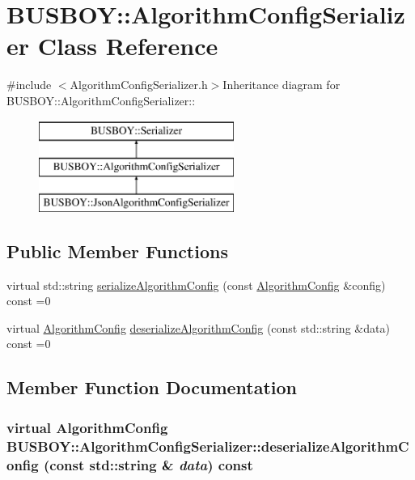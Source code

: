 \hypertarget{classBUSBOY_1_1AlgorithmConfigSerializer}{
\section{BUSBOY::AlgorithmConfigSerializer Class Reference}
\label{classBUSBOY_1_1AlgorithmConfigSerializer}
}


{\ttfamily \#include $<$AlgorithmConfigSerializer.h$>$}Inheritance diagram for BUSBOY::AlgorithmConfigSerializer::\begin{figure}[H]
\begin{center}
\leavevmode
\includegraphics[height=3cm]{classBUSBOY_1_1AlgorithmConfigSerializer}
\end{center}
\end{figure}
\subsection*{Public Member Functions}
\begin{DoxyCompactItemize}
\item 
virtual std::string \hyperlink{classBUSBOY_1_1AlgorithmConfigSerializer_aab7e9c8da6db22fd09cc1faf8758e58f}{serializeAlgorithmConfig} (const \hyperlink{classBUSBOY_1_1AlgorithmConfig}{AlgorithmConfig} \&config) const =0
\item 
virtual \hyperlink{classBUSBOY_1_1AlgorithmConfig}{AlgorithmConfig} \hyperlink{classBUSBOY_1_1AlgorithmConfigSerializer_a39d110a8d569616b55c0486d62ad21ba}{deserializeAlgorithmConfig} (const std::string \&data) const =0
\end{DoxyCompactItemize}


\subsection{Member Function Documentation}
\hypertarget{classBUSBOY_1_1AlgorithmConfigSerializer_a39d110a8d569616b55c0486d62ad21ba}{
\subsubsection[{deserializeAlgorithmConfig}]{\setlength{\rightskip}{0pt plus 5cm}virtual {\bf AlgorithmConfig} BUSBOY::AlgorithmConfigSerializer::deserializeAlgorithmConfig (const std::string \& {\em data}) const}}
\label{classBUSBOY_1_1AlgorithmConfigSerializer_a39d110a8d569616b55c0486d62ad21ba}


